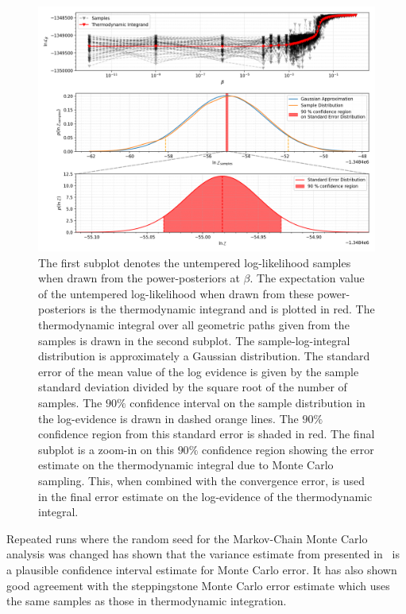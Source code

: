 \begin{figure}[th]
\centering
\includegraphics[width=0.9\columnwidth]{figs/chapter6/ti_monte_carlo_error.png}
\caption{The first subplot denotes the untempered log-likelihood samples when drawn from the power-posteriors at $\beta$. The expectation value of the untempered log-likelihood when drawn from these power-posteriors is the thermodynamic integrand and is plotted in red. The thermodynamic integral over all geometric paths given from the samples is drawn in the second subplot. The sample-log-integral distribution is approximately a Gaussian distribution. The standard error of the mean value of the log evidence is given by the sample standard deviation divided by the square root of the number of samples. The $90 \%$ confidence interval on the sample distribution in the log-evidence is drawn in dashed orange lines. The $90\%$ confidence region from this standard error is shaded in red. The final subplot is a zoom-in on this $90 \%$ confidence region showing the error estimate on the thermodynamic integral due to Monte Carlo sampling. This, when combined with the convergence error, is used in the final error estimate on the log-evidence of the thermodynamic integral.}
\label{fig:ti_monte_carlo_error}
\end{figure}

Repeated runs where the random seed for the Markov-Chain Monte Carlo analysis was changed has shown that the variance estimate from presented in~\cite{annis2019thermodynamic} is a plausible confidence interval estimate for Monte Carlo error. It has also shown good agreement with the steppingstone Monte Carlo error estimate which uses the same samples as those in thermodynamic integration.

